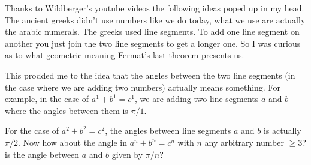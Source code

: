 \documentclass[aps,preprint,preprintnumbers,nofootinbib,showpacs,prd]{revtex4-1}
\begin{document}
Thanks to Wildberger's youtube videos the following ideas poped up in my head. The ancient greeks didn't use numbers like we do today, what we use are actually the arabic numerals. The greeks used line segments. To add one line segment on another you just join the two line segments to get a longer one. So I was curious as to what geometric meaning Fermat's last theorem presents us.

This prodded me to the idea that the angles between the two line segments (in the case where we are adding two numbers) actually means something. For example, in the case of $a^1 + b^1 = c^1$, we are adding two line segments $a$ and $b$ where the angles between them is $\pi/1$.

For the case of $a^2 + b^2 = c^2$, the angles between line segments $a$ and $b$ is actually $\pi/2$. Now how about the angle in $a^n + b^n = c^n$ with $n$ any arbitrary number $\ge 3$? is the angle between $a$ and $b$ given by $\pi/n$?
\end{document}
